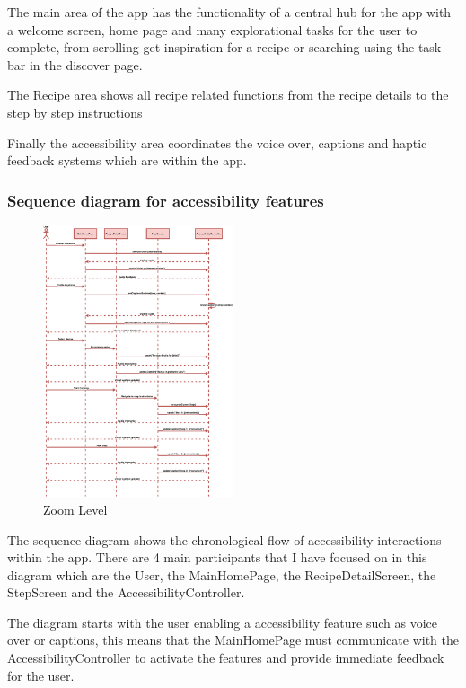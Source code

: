 \documentclass[]{project_final}
\begin{document}
The main area of the app has the functionality of a central hub for the app with a welcome screen, home page and many explorational tasks for the user to complete, from scrolling get inspiration for a recipe or searching using the task bar in the discover page.

The Recipe area shows all recipe related functions from the recipe details to the step by step instructions

Finally the accessibility area coordinates the voice over, captions and haptic feedback systems which are within the app.

\newpage

\subsubsection{Sequence diagram for accessibility features}
\begin{figure}[ht!]
  \centering
  \includegraphics[width=0.5\textwidth]{accessibilityfeaturesSequence.png}
  \vspace*{0.0cm}
  \caption{Zoom Level}
  \label{fig:1}
\end{figure}

The sequence diagram shows the chronological flow of accessibility interactions within the app. There are 4 main participants that I have focused on in this diagram which are the User, the MainHomePage, the RecipeDetailScreen, the StepScreen and the AccessibilityController.

The diagram starts with the user enabling a accessibility feature such as voice over or captions, this means that the MainHomePage must communicate with the AccessibilityController to activate the features and provide immediate feedback for the user.
\end{document}
